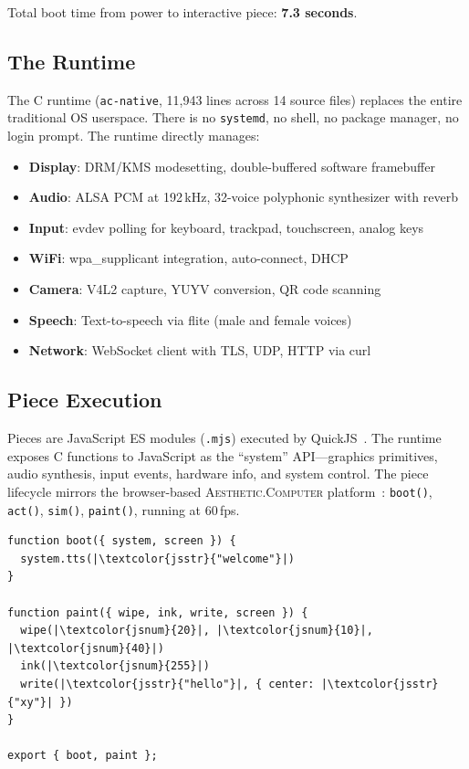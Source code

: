 \documentclass[10pt,letterpaper,twocolumn]{article}
\newcommand{\ac}{\textsc{Aesthetic.Computer}}
\begin{document}
Total boot time from power to interactive piece: \textbf{7.3 seconds}.

\subsection{The Runtime}

The C runtime (\texttt{ac-native}, 11,943 lines across 14 source files) replaces the entire traditional OS userspace. There is no \texttt{systemd}, no shell, no package manager, no login prompt. The runtime directly manages:

\begin{itemize}
  \item \textbf{Display}: DRM/KMS modesetting, double-buffered software framebuffer
  \item \textbf{Audio}: ALSA PCM at 192\,kHz, 32-voice polyphonic synthesizer with reverb
  \item \textbf{Input}: evdev polling for keyboard, trackpad, touchscreen, analog keys
  \item \textbf{WiFi}: wpa\_supplicant integration, auto-connect, DHCP
  \item \textbf{Camera}: V4L2 capture, YUYV conversion, QR code scanning
  \item \textbf{Speech}: Text-to-speech via flite (male and female voices)
  \item \textbf{Network}: WebSocket client with TLS, UDP, HTTP via curl
\end{itemize}

\subsection{Piece Execution}

Pieces are JavaScript ES modules (\texttt{.mjs}) executed by QuickJS~\citep{bellard2005quickjs}. The runtime exposes C functions to JavaScript as the ``system'' API---graphics primitives, audio synthesis, input events, hardware info, and system control. The piece lifecycle mirrors the browser-based \ac{} platform~\citep{scudder2026ac}: \texttt{boot()}, \texttt{act()}, \texttt{sim()}, \texttt{paint()}, running at 60\,fps.

\begin{lstlisting}[style=acjsstyle]
function boot({ system, screen }) {
  system.tts(|\textcolor{jsstr}{"welcome"}|)
}

function paint({ wipe, ink, write, screen }) {
  wipe(|\textcolor{jsnum}{20}|, |\textcolor{jsnum}{10}|, |\textcolor{jsnum}{40}|)
  ink(|\textcolor{jsnum}{255}|)
  write(|\textcolor{jsstr}{"hello"}|, { center: |\textcolor{jsstr}{"xy"}| })
}

export { boot, paint };
\end{lstlisting}
\end{document}
